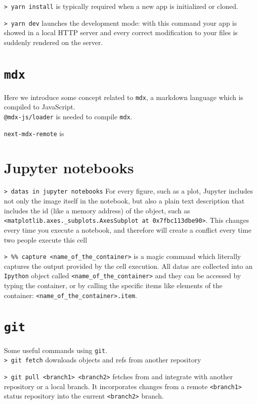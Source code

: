 \documentclass[11pt]{article}
\newcommand{\cmd}[1]{\colorbox{light-gray}{\textcolor{gio}{\texttt{#1}}}}
\begin{document}
\begin{multicols}{2}
\cmd{> yarn install} is typically required when a new app is initialized or cloned.

\cmd{> yarn dev} launches the development mode: with this command your app is
showed in a local HTTP server and every correct modification to your files is
suddenly rendered on the server.

\section{\texttt{mdx}}

Here we introduce some concept related to \texttt{mdx}, a markdown language which is compiled to JavaScript. \\

\cmd{@mdx-js/loader} is needed to compile \texttt{mdx}.

\cmd{next-mdx-remote} is 


\section{Jupyter notebooks}

\cmd{> datas in jupyter notebooks} For every figure, such as a plot, Jupyter includes not only the image itself in the notebook, but also a plain text description that includes the id (like a memory address) of the object, such as \texttt{<matplotlib.axes.\_subplots.AxesSubplot at 0x7fbc113dbe90>}. This changes every time you execute a notebook, and therefore will create a conflict every time two people execute this cell

\cmd{> \%\% capture <name\_of\_the\_container>} is a magic command which literally captures the output provided 
by the cell execution. All datas are collected into an \texttt{Ipython} object 
called \texttt{<name\_of\_the\_container>} and they can be accessed by typing the container,
or by calling the specific items like elements of the container: \texttt{<name\_of\_the\_container>.item}. 


\section{\texttt{git}}

Some useful commands using \texttt{git}. \\

\cmd{> git fetch} downloads objects and refs from another repository

\cmd{> git pull <branch1> <branch2>} fetches from and integrate with another repository or a local branch. It incorporates changes from a remote \texttt{<branch1>} status repository into the current \texttt{<branch2>} branch.


\end{multicols}
\end{document}
